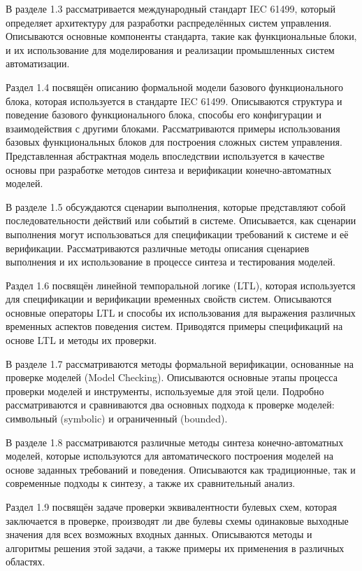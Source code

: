 В разделе 1.3 рассматривается международный стандарт IEC 61499, который определяет архитектуру для разработки распределённых систем управления.
Описываются основные компоненты стандарта, такие как функциональные блоки, и их использование для моделирования и реализации промышленных систем автоматизации.

Раздел 1.4 посвящён описанию формальной модели базового функционального блока, которая используется в стандарте IEC 61499.
Описываются структура и поведение базового функционального блока, способы его конфигурации и взаимодействия с другими блоками.
Рассматриваются примеры использования базовых функциональных блоков для построения сложных систем управления.
Представленная абстрактная модель впоследствии используется в качестве основы при разработке методов синтеза и верификации конечно-автоматных моделей.

В разделе 1.5 обсуждаются сценарии выполнения, которые представляют собой последовательности действий или событий в системе. Описывается, как сценарии выполнения могут использоваться для спецификации требований к системе и её верификации. Рассматриваются различные методы описания сценариев выполнения и их использование в процессе синтеза и тестирования моделей.

Раздел 1.6 посвящён линейной темпоральной логике (LTL), которая используется для спецификации и верификации временных свойств систем. Описываются основные операторы LTL и способы их использования для выражения различных временных аспектов поведения систем. Приводятся примеры спецификаций на основе LTL и методы их проверки.

В разделе 1.7 рассматриваются методы формальной верификации, основанные на проверке моделей (Model Checking).
Описываются основные этапы процесса проверки моделей и инструменты, используемые для этой цели.
Подробно рассматриваются и сравниваются два основных подхода к проверке моделей: символьный (symbolic) и ограниченный (bounded).

В разделе 1.8 рассматриваются различные методы синтеза конечно-автоматных моделей, которые используются для автоматического построения моделей на основе заданных требований и поведения.
Описываются как традиционные, так и современные подходы к синтезу, а также их сравнительный анализ.

Раздел 1.9 посвящён задаче проверки эквивалентности булевых схем, которая заключается в проверке, производят ли две булевы схемы одинаковые выходные значения для всех возможных входных данных.
Описываются методы и алгоритмы решения этой задачи, а также примеры их применения в различных областях.

